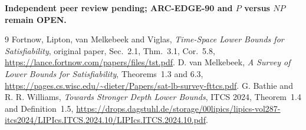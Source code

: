 \documentclass[11pt]{article}
\newcommand{\OPEN}{\textbf{OPEN}}
\begin{document}
\textbf{Independent peer review pending; ARC-EDGE-90 and $P$ versus $NP$ remain \OPEN.}
\begin{thebibliography}{9}
 Fortnow, Lipton, van Melkebeek and Viglas, \emph{Time-Space Lower Bounds for Satisfiability}, original paper, Sec.~2.1, Thm.~3.1, Cor.~5.8, \url{https://lance.fortnow.com/papers/files/tst.pdf}.
 D. van Melkebeek, \emph{A Survey of Lower Bounds for Satisfiability}, Theorems~1.3 and 6.3, \url{https://pages.cs.wisc.edu/~dieter/Papers/sat-lb-survey-fttcs.pdf}.
 G. Bathie and R. R. Williams, \emph{Towards Stronger Depth Lower Bounds}, ITCS 2024, Theorem~1.4 and Definition~1.5, \url{https://drops.dagstuhl.de/storage/00lipics/lipics-vol287-itcs2024/LIPIcs.ITCS.2024.10/LIPIcs.ITCS.2024.10.pdf}.
\end{thebibliography}
\end{document}
